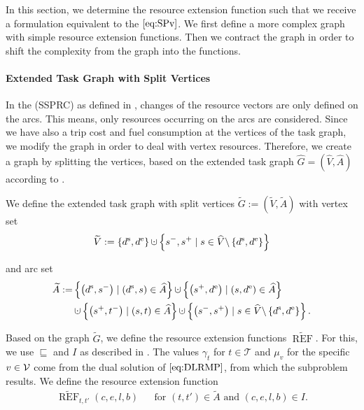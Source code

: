 In this section, we determine the resource extension function such that we receive a formulation equivalent to the $\eqref{eq:SPv}$. We first define a more complex graph with simple resource extension functions. Then we contract the graph in order to shift the complexity from the graph into the functions.

\paragraph{Extended Task Graph with Split Vertices} \parfill

In the (SSPRC) as defined in , changes of the resource vectors are only defined on the arcs. This means, only resources occurring on the arcs are considered. Since we have also a trip cost and fuel consumption at the vertices of the task graph, we modify the graph in order to deal with vertex resources. Therefore, we create a graph by splitting the vertices, based on the extended task graph $\widehat{G}=\left(\widehat{V},\widehat{A}\right)$ according to . 

We define the extended task graph with split vertices ${\widetilde{G} := \left(\widetilde{V},\widetilde{A}\right)}$ with vertex set
\begin{align*}
	\widetilde{V} := \left\{\ds,\de\right\}\cupdot\left\{s^-,s^+\mid s\in\widehat{V}\backslash\left\{\ds,\de\right\}\right\}
\end{align*}

and arc set
\begin{align*}
	\widetilde{A} := & \left\{\left(\ds,s^-\right)\mid \left(\ds,s\right)\in\widehat{A}\right\}\cupdot\left\{\left(s^+,\de\right)\mid\left(s,\de\right)\in\widehat{A}\right\} \\
	& \cupdot\left\{\left(s^+,t^-\right)\mid (s,t)\in\widehat{A}\right\}\cupdot\left\{\left(s^-,s^+\right)\mid s\in\widehat{V}\backslash\left\{\ds,\de\right\}\right\}.
\end{align*}

Based on the graph $\widetilde{G}$, we define the resource extension functions $\widetilde{\operatorname{REF}}$. For this, we use $\sqsubseteq$ and $I$ as described in . The values $\gamma_t$ for $t\in\mathcal{T}$ and $\mu_v$ for the specific $v\in\mathcal{V}$ come from the dual solution of $\eqref{eq:DLRMP}$, from which the subproblem results. We define the resource extension function
\begin{align*}
	\widetilde{\operatorname{REF}}_{t,t'}(c,e,l,b) && \text{for } \left(t,t'\right)\in\widetilde{A} \text{ and } (c,e,l,b)\in I.
\end{align*}

